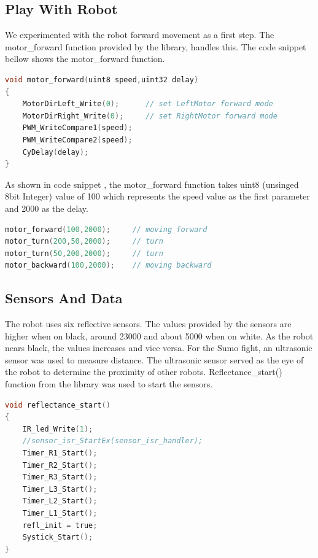 \documentclass[11pt,a4paper,oneside,article]{memoir}
\begin{document}
\subsection{Play With Robot}
We experimented with the robot forward movement as a first step. The motor\_forward function provided by the library, handles this. The code snippet bellow shows the motor\_forward function.
\vspace{-22pt}\begin{lstlisting}[language=C,caption={Robot Forward Move Function},label=Move] 
void motor_forward(uint8 speed,uint32 delay)
{
    MotorDirLeft_Write(0);      // set LeftMotor forward mode
    MotorDirRight_Write(0);     // set RightMotor forward mode
    PWM_WriteCompare1(speed); 
    PWM_WriteCompare2(speed); 
    CyDelay(delay);
}
\end{lstlisting}\vspace{-22pt}
As shown in code snippet  , the motor\_forward function takes uint8 (unsinged 8bit Integer) value of 100 which represents the speed value as the first parameter and 2000 as the delay.  
\vspace{-22pt}\begin{lstlisting}[language=C,caption={Robot Forward Move Code},label=MoveCode] 
motor_forward(100,2000);     // moving forward
motor_turn(200,50,2000);     // turn
motor_turn(50,200,2000);     // turn
motor_backward(100,2000);    // moving backward
\end{lstlisting}\vspace{-22pt}

\subsection{Sensors And Data}
The robot uses six reflective sensors. The values provided by the sensors are higher when on black, around 23000 and about 5000 when on white. 
As the robot nears black, the values increases and vice versa. For the Sumo fight, an ultrasonic sensor was used to measure distance. The ultrasonic sensor served as the eye of the robot to determine the proximity of other robots. Reflectance\_start() function from the library was used to start the sensors.
\vspace{-22pt}\begin{lstlisting}[language=C,caption={Reflectance},label=Reflect] 
void reflectance_start()
{
    IR_led_Write(1);
    //sensor_isr_StartEx(sensor_isr_handler);
    Timer_R1_Start();
    Timer_R2_Start();
    Timer_R3_Start();
    Timer_L3_Start();
    Timer_L2_Start();
    Timer_L1_Start();
    refl_init = true;
    Systick_Start();
}
\end{lstlisting}\vspace{-22pt}
\end{document}
